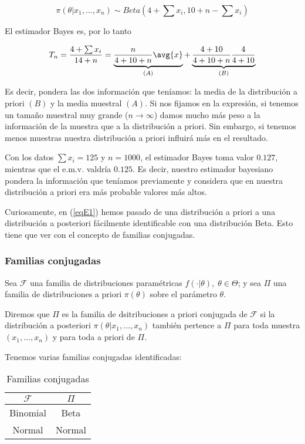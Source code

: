 \documentclass{apuntes}
\begin{document}
\[  \pi(\theta | x_1,\dotsc,x_n)  \sim Beta(4 + \sum x_i, 10 + n - \sum x_i) \]

El estimador Bayes es, por lo tanto

\[ T_n = \frac{4 + \sum x_i}{14 + n} = \underbrace{\frac{n}{4 + 10 + n}\avg{x}}_{(A)} + \underbrace{\frac{4+10}{4+10+n}\frac{4}{4+10}}_{(B)} \]

Es decir, pondera las dos información que teníamos: la media de la distribución a priori $(B)$ y la media muestral $(A)$. Si nos fijamos en la expresión, si tenemos un tamaño muestral muy grande ($n\to\infty$) damos mucho más peso a la información de la muestra que a la distribución a priori. Sin embargo, si tenemos menos muestras nuestra distribución a priori influirá más en el resultado.

Con los datos $\sum x_i = 125$ y $n = 1000$, el estimador Bayes toma valor $0.127$, mientras que el e.m.v. valdría $0.125$. Es decir, nuestro estimador bayesiano pondera la información que teníamos previamente y considera que en nuestra distribución a priori era más probable valores más altos.

Curiosamente, en (\ref{eqE1}) hemos pasado de una distribución a priori a una distribución a posteriori fácilmente identificable con una distribución Beta. Esto tiene que ver con el concepto de familias conjugadas.

\subsubsection{Familias conjugadas}

\begin{defn} Sea $\mathcal{F}$ una familia de distribuciones paramétricas $f(\cdot | \theta),\;\theta\in\Theta$; y sea $\Pi$ una familia de distribuciones a priori $\pi(\theta)$ sobre el parámetro $\theta$. 

Diremos que $\Pi$ es la familia de dsitribuciones a priori conjugada de $\mathcal{F}$ si la distribución a posteriori $ \pi(\theta | x_1,\dotsc,x_n) $ también pertence a $\Pi$ para toda muestra $ ( x_1,\dotsc,x_n) $ y para toda a priori de $\Pi$.
\end{defn}

Tenemos varias familias conjugadas identificadas:
\begin{table}[hbtp]
\centering
\begin{tabular}{c|c}
$\mathcal{F}$ & $\Pi$ \\
\hline 
Binomial & Beta \\ 
\hline 
Normal & Normal \\ 
\end{tabular} 
\caption{Familias conjugadas}
\end{table}
\end{document}
